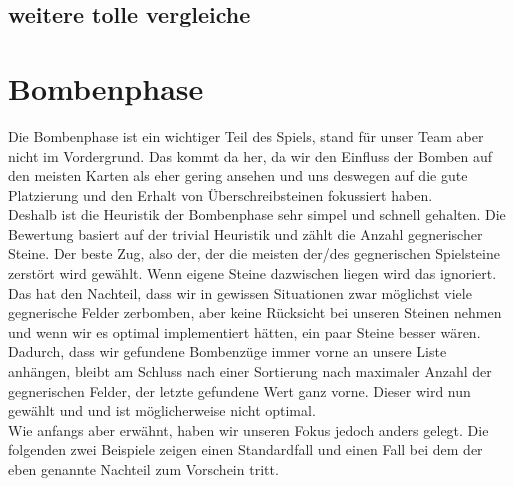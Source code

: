 \documentclass[12pt,a4paper,bibliography=totocnumbered,listof=totocnumbered]{scrartcl}
\begin{document}
	\subsection{weitere tolle vergleiche}
	\vspace{1em}

    \newpage
    
    \section{Bombenphase}
    \vspace{1em}
    
    Die Bombenphase ist ein wichtiger Teil des Spiels, stand für unser Team aber nicht im Vordergrund. Das kommt da her, da wir den Einfluss der Bomben auf den meisten Karten als eher gering ansehen und uns deswegen auf die gute Platzierung und den Erhalt von Überschreibsteinen fokussiert haben.\\
    Deshalb ist die Heuristik der Bombenphase sehr simpel und schnell gehalten. Die Bewertung basiert auf der trivial Heuristik und zählt die Anzahl gegnerischer Steine. Der beste Zug, also der, der die meisten der/des gegnerischen Spielsteine zerstört wird gewählt. Wenn eigene Steine dazwischen liegen wird das ignoriert. Das hat den Nachteil, dass wir in gewissen Situationen zwar möglichst viele gegnerische Felder zerbomben, aber keine Rücksicht bei unseren Steinen nehmen und wenn wir es optimal implementiert hätten, ein paar Steine besser wären. Dadurch, dass wir gefundene Bombenzüge immer vorne an unsere Liste anhängen, bleibt am Schluss nach einer Sortierung nach maximaler Anzahl der gegnerischen Felder, der letzte gefundene Wert ganz vorne. Dieser wird nun gewählt und und ist möglicherweise nicht optimal.\\
    Wie anfangs aber erwähnt, haben wir unseren Fokus jedoch anders gelegt. Die folgenden zwei Beispiele zeigen einen \glqq Standardfall\grqq{} und einen Fall bei dem der eben genannte Nachteil zum Vorschein tritt.
\end{document}
